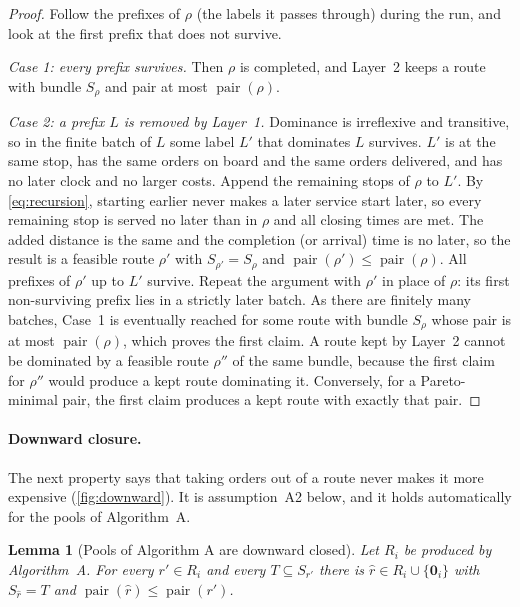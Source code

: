 \documentclass[11pt]{article}
\newtheorem{plemma}{Lemma}
\theoremstyle{definition}
\theoremstyle{remark}
\newcommand{\idle}{\mathbf{0}}
\newcommand{\pair}{\operatorname{pair}}
\begin{document}
\begin{proof}
Follow the prefixes of $\rho$ (the labels it passes through) during the run,
and look at the first prefix that does not survive.

\emph{Case 1: every prefix survives.} Then $\rho$ is completed, and Layer~2
keeps a route with bundle $S_\rho$ and pair at most $\pair(\rho)$.

\emph{Case 2: a prefix $L$ is removed by Layer~1.} Dominance is irreflexive and
transitive, so in the finite batch of $L$ some label $L'$ that dominates $L$
survives. $L'$ is at the same stop, has the same orders on board and the same
orders delivered, and has no later clock and no larger costs. Append the
remaining stops of $\rho$ to $L'$. By \eqref{eq:recursion}, starting earlier
never makes a later service start later, so every remaining stop is served no
later than in $\rho$ and all closing times are met. The added distance is the
same and the completion (or arrival) time is no later, so the result is a
feasible route $\rho'$ with $S_{\rho'}=S_\rho$ and $\pair(\rho')\le\pair(\rho)$. All prefixes of
$\rho'$ up to $L'$ survive. Repeat the argument with $\rho'$ in place of $\rho$:
its first non-surviving prefix lies in a strictly later batch. As there are
finitely many batches, Case~1 is eventually reached for some route with
bundle $S_\rho$ whose pair is at most $\pair(\rho)$, which proves the first
claim. A route kept by Layer~2 cannot be dominated by a feasible route
$\rho''$ of the same bundle, because the first claim for $\rho''$ would produce
a kept route dominating it. Conversely, for a Pareto-minimal pair, the first
claim produces a kept route with exactly that pair.
\end{proof}

\paragraph{Downward closure.}
The next property says that taking orders out of a route never makes it more
expensive (\cref{fig:downward}). It is assumption~A2 below, and it holds
automatically for the pools of Algorithm~A.

\begin{plemma}[Pools of Algorithm A are downward closed]\label{lem:downward}
Let $R_i$ be produced by Algorithm~A. For every $r'\in R_i$ and
every $T\subseteq S_{r'}$ there is $\hat r\in R_i\cup\{\idle_i\}$ with
$S_{\hat r}=T$ and $\pair(\hat r)\le\pair(r')$.
\end{plemma}
\end{document}
